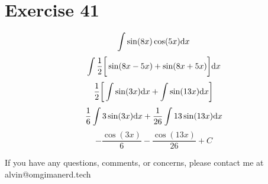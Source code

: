 \documentclass[letterpaper, 12pt]{math}
\begin{document}
\section*{Exercise 41}
\[ \int{\sin(8x)\cos(5x)\mathrm{d}{x}} \]
\[ \int{\frac{1}{2}\bigg[\sin(8x-5x)+\sin(8x+5x)\bigg]\mathrm{d}{x}} \]
\[ \frac{1}{2}\bigg[\int{\sin(3x)\mathrm{d}{x}}+\int{\sin(13x)\mathrm{d}{x}}\bigg] \]
\[ \frac{1}{6}\int{3\sin(3x)\mathrm{d}{x}}+\frac{1}{26}\int{13\sin(13x)\mathrm{d}{x}} \]
\[ -\frac{\cos(3x)}{6}-\frac{\cos(13x)}{26}+C \]

\begin{center}
  If you have any questions, comments, or concerns, please contact me at
  alvin@omgimanerd.tech
\end{center}
\end{document}
